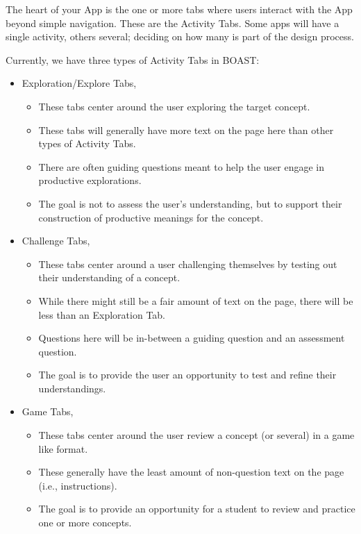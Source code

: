 \documentclass[
]{book}
\providecommand{\tightlist}{%
  \setlength{\itemsep}{0pt}\setlength{\parskip}{0pt}}
\begin{document}
The heart of your App is the one or more tabs where users interact with the App beyond simple navigation. These are the Activity Tabs. Some apps will have a single activity, others several; deciding on how many is part of the design process.

Currently, we have three types of Activity Tabs in BOAST:

\begin{itemize}
\tightlist
\item
  Exploration/Explore Tabs,

  \begin{itemize}
  \tightlist
  \item
    These tabs center around the user exploring the target concept.
  \item
    These tabs will generally have more text on the page here than other types of Activity Tabs.
  \item
    There are often guiding questions meant to help the user engage in productive explorations.
  \item
    The goal is not to assess the user's understanding, but to support their construction of productive meanings for the concept.
  \end{itemize}
\item
  Challenge Tabs,

  \begin{itemize}
  \tightlist
  \item
    These tabs center around a user challenging themselves by testing out their understanding of a concept.
  \item
    While there might still be a fair amount of text on the page, there will be less than an Exploration Tab.
  \item
    Questions here will be in-between a guiding question and an assessment question.
  \item
    The goal is to provide the user an opportunity to test and refine their understandings.
  \end{itemize}
\item
  Game Tabs,

  \begin{itemize}
  \tightlist
  \item
    These tabs center around the user review a concept (or several) in a game like format.
  \item
    These generally have the least amount of non-question text on the page (i.e., instructions).
  \item
    The goal is to provide an opportunity for a student to review and practice one or more concepts.
  \end{itemize}
\end{itemize}
\end{document}
